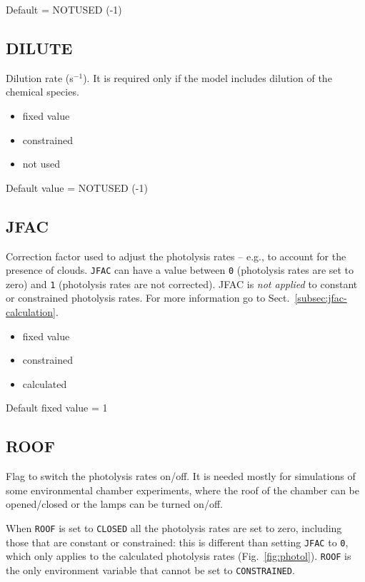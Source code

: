 Default = NOTUSED (-1)

\subsection{DILUTE} \label{subsec:dilute}

Dilution rate (s$^{-1}$). It is required only if the model includes
dilution of the chemical species. %

\begin{itemize}
\item fixed value
\item constrained
\item not used
\end{itemize}

Default value = NOTUSED (-1)

\subsection{JFAC} \label{subsec:jfac}

Correction factor used to adjust the photolysis rates -- e.g., to
account for the presence of clouds. \texttt{JFAC} can have a value
between \texttt{0} (photolysis rates are set to zero) and \texttt{1}
(photolysis rates are not corrected). JFAC is \emph{not applied} to
constant or constrained photolysis rates. For more information go to
Sect.~\ref{subsec:jfac-calculation}.

\begin{itemize}
\item fixed value
\item constrained
\item calculated
\end{itemize}

Default fixed value = 1

\subsection{ROOF} \label{subsec:roof}

Flag to switch the photolysis rates on/off. It is needed mostly for
simulations of some environmental chamber experiments, where the roof
of the chamber can be opened/closed or the lamps can be turned on/off.

When \texttt{ROOF} is set to \texttt{CLOSED} all the photolysis rates
are set to zero, including those that are constant or constrained:
this is different than setting \texttt{JFAC} to \texttt{0}, which only
applies to the calculated photolysis rates (Fig.~\ref{fig:photol}).
\texttt{ROOF} is the only environment variable that cannot be set to
\texttt{CONSTRAINED}.

